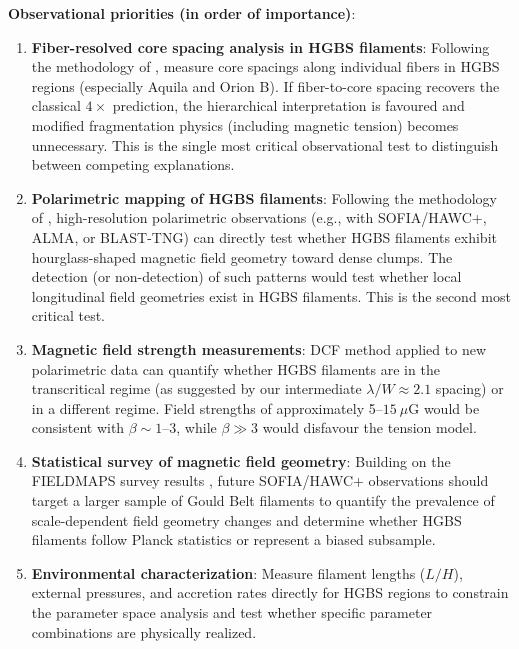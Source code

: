 \documentclass[11pt,a4paper]{article}
\begin{document}
\textbf{Observational priorities (in order of importance)}:
\begin{enumerate}
    \item \textbf{Fiber-resolved core spacing analysis in HGBS filaments}: Following the methodology of \citet{Yang2024}, measure core spacings along individual fibers in HGBS regions (especially Aquila and Orion B). If fiber-to-core spacing recovers the classical $4\times$ prediction, the hierarchical interpretation is favoured and modified fragmentation physics (including magnetic tension) becomes unnecessary. This is the single most critical observational test to distinguish between competing explanations.

    \item \textbf{Polarimetric mapping of HGBS filaments}: Following the methodology of \citet{Jadhav2026}, high-resolution polarimetric observations (e.g., with SOFIA/HAWC+, ALMA, or BLAST-TNG) can directly test whether HGBS filaments exhibit hourglass-shaped magnetic field geometry toward dense clumps. The detection (or non-detection) of such patterns would test whether local longitudinal field geometries exist in HGBS filaments. This is the second most critical test.

    \item \textbf{Magnetic field strength measurements}: DCF method applied to new polarimetric data can quantify whether HGBS filaments are in the transcritical regime (as suggested by our intermediate $\lambda/W \approx 2.1$ spacing) or in a different regime. Field strengths of approximately 5--$15~\mu$G would be consistent with $\beta \sim 1$--$3$, while $\beta \gg 3$ would disfavour the tension model.

    \item \textbf{Statistical survey of magnetic field geometry}: Building on the FIELDMAPS survey results \citep{Coude2025}, future SOFIA/HAWC+ observations should target a larger sample of Gould Belt filaments to quantify the prevalence of scale-dependent field geometry changes and determine whether HGBS filaments follow Planck statistics or represent a biased subsample.

    \item \textbf{Environmental characterization}: Measure filament lengths ($L/H$), external pressures, and accretion rates directly for HGBS regions to constrain the parameter space analysis and test whether specific parameter combinations are physically realized.
\end{enumerate}
\end{document}
